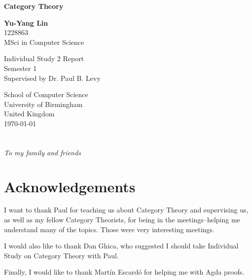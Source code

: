 \documentclass[11pt,twoside]{report}
\theoremstyle{definition}
\begin{document}
\begin{titlepage}
    \begin{center}
        \vspace*{1cm}

        \Huge
        \textbf{Category Theory}

        \vspace{0.5cm}
        \LARGE

        \vspace{1.5cm}

        \textbf{Yu-Yang Lin}\\
        1228863\\
        MSci in Computer Science

        \vfill

        Individual Study 2 Report\\
        Semester 1\\
        Supervised by Dr. Paul B. Levy

        \vspace{0.8cm}

        \Large
        School of Computer Science\\
        University of Birmingham\\
        United Kingdom\\
        \today

    \end{center}
\end{titlepage}

\chapter*{}
\begin{center}\textit{To my family and friends}\end{center}

\chapter*{Acknowledgements}
I want to thank Paul for teaching us about Category Theory and supervising us, as well as my fellow Category Theorists, for being in the meetings--helping me understand many of the topics. Those were very interesting meetings.

I would also like to thank Dan Ghica, who suggested I should take Individual Study on Category Theory with Paul.

Finally, I would like to thank Martín Escardó for helping me with Agda proofs.
\tableofcontents
\end{document}
